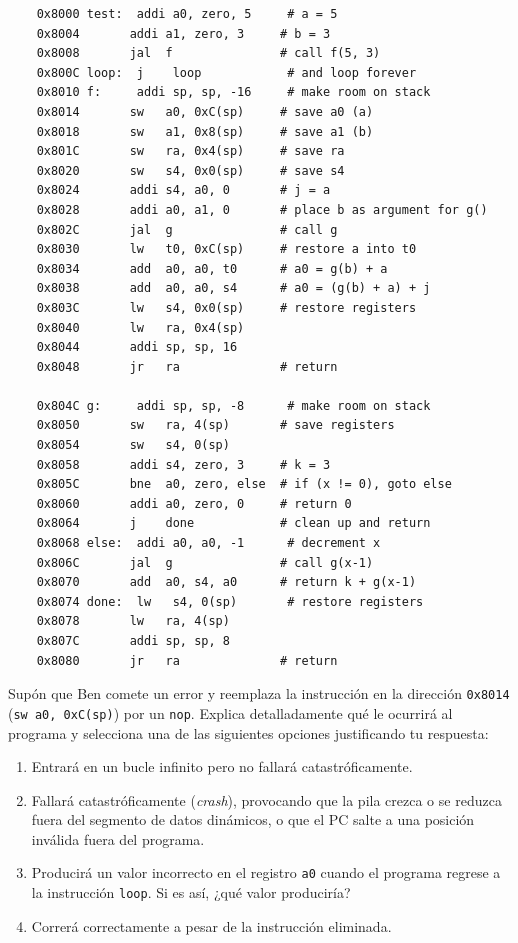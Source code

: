 \documentclass[letterpaper,12pt]{article}
\begin{document}
\begin{enumerate}
\begin{verbatim}
    0x8000 test:  addi a0, zero, 5     # a = 5
    0x8004       addi a1, zero, 3     # b = 3
    0x8008       jal  f               # call f(5, 3)
    0x800C loop:  j    loop            # and loop forever
    0x8010 f:     addi sp, sp, -16     # make room on stack
    0x8014       sw   a0, 0xC(sp)     # save a0 (a)
    0x8018       sw   a1, 0x8(sp)     # save a1 (b)
    0x801C       sw   ra, 0x4(sp)     # save ra
    0x8020       sw   s4, 0x0(sp)     # save s4
    0x8024       addi s4, a0, 0       # j = a
    0x8028       addi a0, a1, 0       # place b as argument for g()
    0x802C       jal  g               # call g
    0x8030       lw   t0, 0xC(sp)     # restore a into t0
    0x8034       add  a0, a0, t0      # a0 = g(b) + a
    0x8038       add  a0, a0, s4      # a0 = (g(b) + a) + j
    0x803C       lw   s4, 0x0(sp)     # restore registers
    0x8040       lw   ra, 0x4(sp)
    0x8044       addi sp, sp, 16
    0x8048       jr   ra              # return

    0x804C g:     addi sp, sp, -8      # make room on stack
    0x8050       sw   ra, 4(sp)       # save registers
    0x8054       sw   s4, 0(sp)
    0x8058       addi s4, zero, 3     # k = 3
    0x805C       bne  a0, zero, else  # if (x != 0), goto else
    0x8060       addi a0, zero, 0     # return 0
    0x8064       j    done            # clean up and return
    0x8068 else:  addi a0, a0, -1      # decrement x
    0x806C       jal  g               # call g(x-1)
    0x8070       add  a0, s4, a0      # return k + g(x-1)
    0x8074 done:  lw   s4, 0(sp)       # restore registers
    0x8078       lw   ra, 4(sp)
    0x807C       addi sp, sp, 8
    0x8080       jr   ra              # return
    \end{verbatim}
    
    \pagebreak
    Supón que Ben comete un error y reemplaza la instrucción en la dirección \texttt{0x8014} (\texttt{sw a0, 0xC(sp)}) por un \texttt{nop}. Explica detalladamente qué le ocurrirá al programa y selecciona una de las siguientes opciones justificando tu respuesta:
    \begin{enumerate}[label=\arabic*)]
        \item Entrará en un bucle infinito pero no fallará catastróficamente.
        \item Fallará catastróficamente (\textit{crash}), provocando que la pila crezca o se reduzca fuera del segmento de datos dinámicos, o que el PC salte a una posición inválida fuera del programa.
        \item Producirá un valor incorrecto en el registro \texttt{a0} cuando el programa regrese a la instrucción \texttt{loop}. Si es así, ¿qué valor produciría?
        \item Correrá correctamente a pesar de la instrucción eliminada.
    \end{enumerate}


\end{enumerate}
\end{document}
